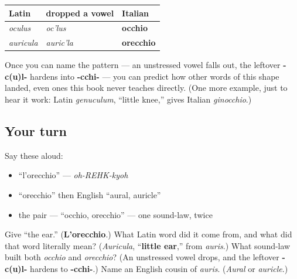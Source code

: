 \begin{grammarlens}[title={Grammar Lens: one law, twice}]
\noindent
\begin{tabularx}{\linewidth}{@{}>{\raggedright\arraybackslash}X>{\raggedright\arraybackslash}X>{\raggedright\arraybackslash}X@{}}
\toprule
\textbf{Latin} & \textbf{dropped a vowel} & \textbf{Italian} \\
\midrule
\emph{oculus} & \emph{oc'lus} & \textbf{occhio} \\
\emph{auricula} & \emph{auric'la} & \textbf{orecchio} \\
\bottomrule
\end{tabularx}

Once you can name the pattern — an unstressed vowel falls out, the leftover \textbf{-c(u)l-} hardens into \textbf{-cchi-} — you can predict how other words of this shape landed, even ones this book never teaches directly. (One more example, just to hear it work: Latin \emph{genuculum}, \textquotedblleft{}little knee,\textquotedblright{} gives Italian \emph{ginocchio}.)
\end{grammarlens}

\subsection*{Your turn}
Say these aloud:

\begin{itemize}
\raggedright
  \item \textquotedblleft{}l'orecchio\textquotedblright{} — \emph{oh-REHK-kyoh}
  \item \textquotedblleft{}orecchio\textquotedblright{} then English \textquotedblleft{}aural, auricle\textquotedblright{}
  \item the pair — \textquotedblleft{}occhio, orecchio\textquotedblright{} — one sound-law, twice
\end{itemize}

\begin{tcolorbox}[breakable,colback=teal!4,colframe=teal!35!black,title={Before you move on}]
Give \textquotedblleft{}the ear.\textquotedblright{} (\textbf{L'orecchio}.) What Latin word did it come from, and what did that word literally mean? (\emph{Auricula}, \textquotedblleft{}\textbf{little ear},\textquotedblright{} from \emph{auris}.) What sound-law built both \emph{occhio} and \emph{orecchio}? (An unstressed vowel drops, and the leftover \textbf{-c(u)l-} hardens to \textbf{-cchi-}.) Name an English cousin of \emph{auris}. (\emph{Aural} or \emph{auricle}.)
\end{tcolorbox}
